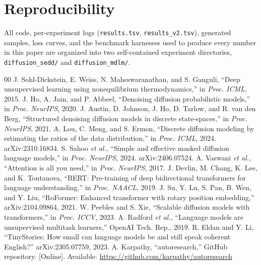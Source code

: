 \documentclass[conference]{IEEEtran}
\begin{document}
\section*{Reproducibility}
All code, per-experiment logs (\texttt{results.tsv},
\texttt{results\_v2.tsv}), generated samples, loss curves, and the
benchmark harnesses used to produce every number in this paper are
organized into two self-contained experiment directories,
\texttt{diffusion\_sedd/} and \texttt{diffusion\_mdlm/}.

\begin{thebibliography}{00}
 J. Sohl-Dickstein, E. Weiss, N. Maheswaranathan, and
S. Ganguli, ``Deep unsupervised learning using nonequilibrium
thermodynamics,'' in \emph{Proc. ICML}, 2015.
 J. Ho, A. Jain, and P. Abbeel, ``Denoising diffusion
probabilistic models,'' in \emph{Proc. NeurIPS}, 2020.
 J. Austin, D. Johnson, J. Ho, D. Tarlow, and
R. van den Berg, ``Structured denoising diffusion models in discrete
state-spaces,'' in \emph{Proc. NeurIPS}, 2021.
 A. Lou, C. Meng, and S. Ermon, ``Discrete diffusion
modeling by estimating the ratios of the data distribution,'' in
\emph{Proc. ICML}, 2024. arXiv:2310.16834.
 S. Sahoo \emph{et al.}, ``Simple and effective masked
diffusion language models,'' in \emph{Proc. NeurIPS}, 2024.
arXiv:2406.07524.
 A. Vaswani \emph{et al.}, ``Attention is all you
need,'' in \emph{Proc. NeurIPS}, 2017.
 J. Devlin, M. Chang, K. Lee, and K. Toutanova, ``BERT:
Pre-training of deep bidirectional transformers for language
understanding,'' in \emph{Proc. NAACL}, 2019.
 J. Su, Y. Lu, S. Pan, B. Wen, and Y. Liu, ``RoFormer:
Enhanced transformer with rotary position embedding,'' arXiv:2104.09864,
2021.
 W. Peebles and S. Xie, ``Scalable diffusion models with
transformers,'' in \emph{Proc. ICCV}, 2023.
 A. Radford \emph{et al.}, ``Language models are
unsupervised multitask learners,'' OpenAI Tech. Rep., 2019.
 R. Eldan and Y. Li, ``TinyStories: How small can
language models be and still speak coherent English?'' arXiv:2305.07759,
2023.
 A. Karpathy, ``autoresearch,'' GitHub repository.
[Online]. Available: \url{https://github.com/karpathy/autoresearch}
\end{thebibliography}
\end{document}
